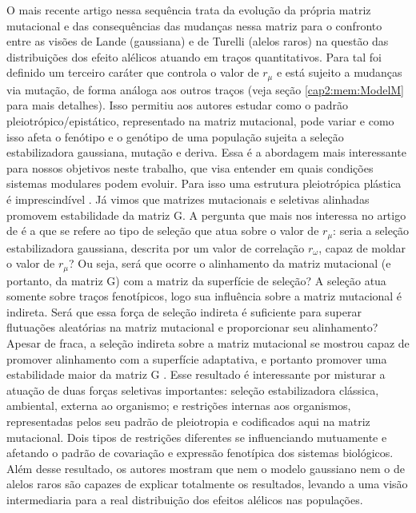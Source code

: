 O mais recente artigo nessa sequência \citep{Jones2007} trata da
evolução da própria matriz mutacional e das consequências das mudanças
nessa matriz para o confronto entre as visões de Lande (gaussiana) e de
Turelli (alelos raros) na questão das distribuições dos efeito alélicos
atuando em traços quantitativos. 
Para tal foi definido um terceiro caráter que controla o valor de
$r_\mu$ e está sujeito a mudanças via mutação, de forma análoga aos
outros traços (veja seção \ref{cap2:mem:ModelM} para mais detalhes). 
Isso permitiu aos autores estudar como o padrão pleiotrópico/epistático,
representado na matriz mutacional, pode variar e como isso afeta o
fenótipo e o genótipo de uma população sujeita a seleção estabilizadora
gaussiana, mutação e deriva. 
Essa é a abordagem mais interessante para nossos objetivos neste
trabalho, que visa entender em quais condições sistemas modulares podem
evoluir. 
Para isso uma estrutura pleiotrópica plástica é imprescindível
\citep{Wagner1996, Pavlicev2011a}. 
Já vimos que matrizes mutacionais e seletivas alinhadas promovem
estabilidade da matriz G. 
A pergunta que mais nos interessa no artigo de \cite{Jones2007} é a que
se refere ao tipo de seleção que atua sobre o valor de $r_\mu$: seria a
seleção estabilizadora gaussiana, descrita por um valor de correlação
$r_\omega$, capaz de moldar o valor de $r_\mu$? 
Ou seja, será que ocorre o alinhamento da matriz mutacional (e portanto,
da matriz G)  com a matriz da superfície de seleção? 
A seleção atua somente sobre traços fenotípicos, logo sua influência
sobre a matriz mutacional é indireta. 
Será que essa força de seleção indireta é suficiente para superar
flutuações aleatórias na matriz mutacional e proporcionar seu
alinhamento? Apesar de fraca, a seleção indireta sobre a matriz
mutacional se mostrou capaz de promover alinhamento com a superfície
adaptativa, e portanto promover uma estabilidade maior da matriz G
\citep{Jones2007}. 
Esse resultado é interessante por misturar a atuação de duas forças
seletivas importantes: seleção estabilizadora clássica, ambiental,
externa ao organismo; e restrições internas aos organismos,
representadas pelos seu padrão de pleiotropia e codificados aqui na
matriz mutacional. 
Dois tipos de restrições diferentes se influenciando mutuamente e
afetando o padrão de covariação e expressão fenotípica dos sistemas
biológicos. 
Além desse resultado, os autores mostram que nem o modelo gaussiano nem
o de alelos raros são capazes de explicar totalmente os resultados,
levando a uma visão intermediaria para a real distribuição dos efeitos
alélicos nas populações. 

